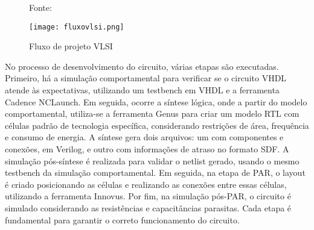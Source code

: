 \begin{figure}[ht!]
    \centering
    \captionsetup{justification=centering}
    \caption*{Fonte: \cite{CMOS2010}}
    \texttt{[image: fluxovlsi.png]}
    \caption{Fluxo de projeto VLSI}
    \label{fig:CMOS2010}
\end{figure}

No processo de desenvolvimento do circuito, várias etapas são executadas. Primeiro, há a simulação comportamental para verificar se o circuito VHDL atende às expectativas, utilizando um testbench em VHDL e a ferramenta Cadence NCLaunch. Em seguida, ocorre a síntese lógica, onde a partir do modelo comportamental, utiliza-se a ferramenta Genus para criar um modelo RTL com células padrão de tecnologia específica, considerando restrições de área, frequência e consumo de energia. A síntese gera dois arquivos: um com componentes e conexões, em Verilog, e outro com informações de atraso no formato SDF. A simulação pós-síntese é realizada para validar o netlist gerado, usando o mesmo testbench da simulação comportamental. Em seguida, na etapa de PAR, o layout é criado posicionando as células e realizando as conexões entre essas células, utilizando a ferramenta Innovus. Por fim, na simulação pós-PAR, o circuito é simulado considerando as resistências e capacitâncias parasitas. Cada etapa é fundamental para garantir o correto funcionamento do circuito.

